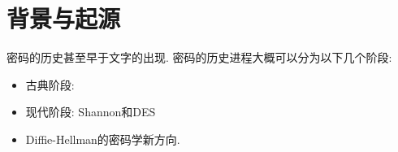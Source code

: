 \section{背景与起源}

密码的历史甚至早于文字的出现. 密码的历史进程大概可以分为以下几个阶段: 
\begin{itemize}
	\item 古典阶段: 
	\item 现代阶段: Shannon和DES 
	\item Diffie-Hellman的密码学新方向.   
\end{itemize}